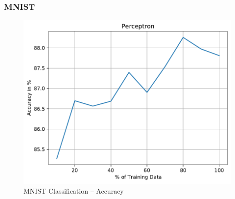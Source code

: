 \documentclass{article}
\begin{document}
  \subsubsection{MNIST}
  \begin{figure}[H]
  \includegraphics[width=\linewidth]{figures/Perceptron_accuracy_MNIST.pdf}\hfill
  \caption{MNIST Classification -- Accuracy}
  \end{figure}
\end{document}
